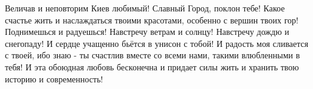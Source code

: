 Величав и неповторим Киев любимый! Славный Город, поклон тебе! Какое счастье
жить и наслаждаться твоими красотами, особенно с вершин твоих гор! Поднимешься
и радуешься! Навстречу ветрам и солнцу!  Навстречу дождю и снегопаду! И сердце
учащенно бьётся в унисон с тобой! И радость моя сливается с твоей, ибо знаю -
ты счастлив вместе со всеми нами, такими влюбленными в тебя! И эта обоюдная
любовь бесконечна и придает силы жить и хранить твою историю и современность!

